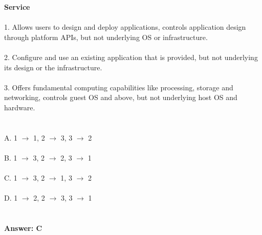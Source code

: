 \documentclass[prl,twocolumn,showpacs,preprintnumbers,superscriptaddress]{revtex4}
\theoremstyle{plain}
\theoremstyle{definition}
\begin{document}
\begin{widetext}
\noindent \textbf{Service}
\\
\\
1. Allows users to design and deploy applications, controls application design through platform APIs, but not underlying OS or infrastructure.
\\
\\
2. Configure and use an existing application that is provided, but not underlying its design or the infrastructure.
\\
\\
3. Offers fundamental computing capabilities like processing, storage and networking, controls guest OS and above, but not underlying host OS and hardware.
\\
\\
\\
\noindent A. 1 $\rightarrow$ 1, 2 $\rightarrow$ 3, 3 $\rightarrow$ 2
\\
\\
B. 1 $\rightarrow$ 3, 2 $\rightarrow$ 2, 3 $\rightarrow$ 1
\\
\\
C. 1 $\rightarrow$ 3, 2 $\rightarrow$ 1, 3 $\rightarrow$ 2
\\
\\
D. 1 $\rightarrow$ 2, 2 $\rightarrow$ 3, 3 $\rightarrow$ 1
\\
\\
\\
\textbf{Answer: C}
\\
\\
\\
\\
\\
\\
\end{widetext}
\end{document}
